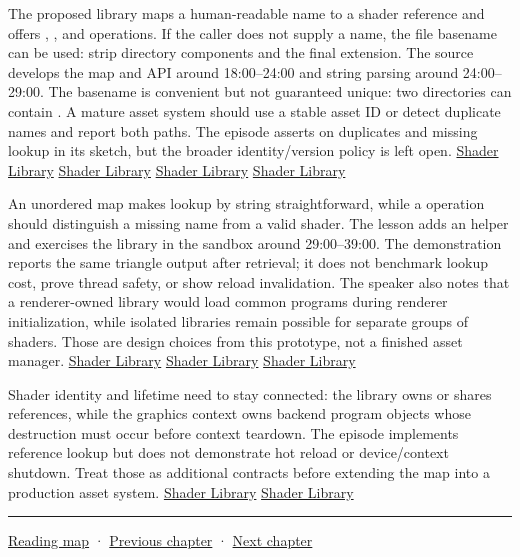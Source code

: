 The proposed library maps a human-readable name to a shader reference and offers , , and  operations. If the caller does not supply a name, the file basename can be used: strip directory components and the final extension. The source develops the map and API around 18:00--24:00 and string parsing around 24:00--29:00. The basename is convenient but not guaranteed unique: two directories can contain . A mature asset system should use a stable asset ID or detect duplicate names and report both paths. The episode asserts on duplicates and missing lookup in its sketch, but the broader identity/version policy is left open. \href{https://www.youtube.com/watch?v=Z9LE3ksHEQQ&t=1080s}{Shader Library} \href{https://www.youtube.com/watch?v=Z9LE3ksHEQQ&t=1320s}{Shader Library} \href{https://www.youtube.com/watch?v=Z9LE3ksHEQQ&t=1500s}{Shader Library} \href{https://www.youtube.com/watch?v=Z9LE3ksHEQQ&t=1680s}{Shader Library}

An unordered map makes lookup by string straightforward, while a  operation should distinguish a missing name from a valid shader. The lesson adds an  helper and exercises the library in the sandbox around 29:00--39:00. The demonstration reports the same triangle output after retrieval; it does not benchmark lookup cost, prove thread safety, or show reload invalidation. The speaker also notes that a renderer-owned library would load common programs during renderer initialization, while isolated libraries remain possible for separate groups of shaders. Those are design choices from this prototype, not a finished asset manager. \href{https://www.youtube.com/watch?v=Z9LE3ksHEQQ&t=1740s}{Shader Library} \href{https://www.youtube.com/watch?v=Z9LE3ksHEQQ&t=2040s}{Shader Library} \href{https://www.youtube.com/watch?v=Z9LE3ksHEQQ&t=2220s}{Shader Library}

Shader identity and lifetime need to stay connected: the library owns or shares references, while the graphics context owns backend program objects whose destruction must occur before context teardown. The episode implements reference lookup but does not demonstrate hot reload or device/context shutdown. Treat those as additional contracts before extending the map into a production asset system. \href{https://www.youtube.com/watch?v=Z9LE3ksHEQQ&t=2400s}{Shader Library} \href{https://www.youtube.com/watch?v=Z9LE3ksHEQQ&t=2460s}{Shader Library}

\begin{center}\rule{0.5\linewidth}{0.5pt}\end{center}

\hyperref[volume-reading-map]{Reading map} · \hyperref[05-engine-i-ch024-profiling-and-languageplatform-ownership]{Previous chapter} · \hyperref[06-engine-ii-ch026-descriptor-arrays-and-backend-limits]{Next chapter}
